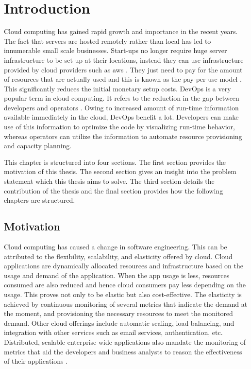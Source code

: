 \documentclass[article,type=msc,colorback,12pt,accentcolor=tud8b,table]{tudthesis}
\begin{document}
\clearpage

\setlength{ \parskip }{1em}
\tableofcontents 
\cleardoublepage 
\listoffigures
\cleardoublepage 
\listoftables
\clearpage
\cleardoublepage 


\hfill
 \section{Introduction}
	 \hfill \break
	
		Cloud computing has gained rapid growth and importance in the recent years. The fact that servers are hosted remotely rather than local has led to innumerable small scale businesses. Start-ups no longer require huge server infrastructure to be set-up at their locations, instead they can use infrastructure provided by cloud providers such as \gls{aws} \cite{aws}. They just need to pay for the amount of resources that are actually used and this is known as the pay-per-use model \cite{armbrust2010view}. This significantly reduces the initial monetary setup costs. DevOps is a very popular term in cloud computing. It refers to the reduction in the gap between developers and operators \cite{httermann2012devops}. Owing to increased amount of run-time information available immediately in the cloud, DevOps benefit a lot. Developers can make use of this information to optimize the code by visualizing run-time behavior, whereas operators can utilize the information to automate resource provisioning and capacity planning.
		
		
		\par This chapter is structured into four sections. The first section provides the motivation of this thesis. The second section gives an insight into the problem statement which this thesis aims to solve. The third section details the contribution of the thesis and the final section provides how the following chapters are structured.
	
	
	\subsection{Motivation}
	
	Cloud computing has caused a change in software engineering. This can be attributed to the flexibility, scalability, and elasticity offered by cloud. Cloud applications are dynamically allocated resources and infrastructure based on the usage and demand of the application. When the app usage is less, resources consumed are also reduced and hence cloud consumers pay less depending on the usage. This proves not only to be elastic but also cost-effective. The elasticity is achieved by continuous monitoring of several metrics that indicate the demand at the moment, and provisioning the necessary resources to meet the monitored demand. Other cloud offerings include automatic scaling, load balancing, and integration with other services such as email services, authentication, etc. Distributed, scalable enterprise-wide applications also mandate the monitoring of metrics that aid the developers and business analysts to reason the effectiveness of their applications \cite{leitner2012application}.
	
\end{document}
